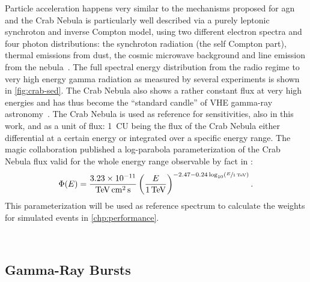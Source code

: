 Particle acceleration happens very similar to the mechanisms proposed for \gls{agn}
and the Crab Nebula is particularly well described via a purely leptonic 
synchroton and inverse Compton model,
using two different electron spectra and four photon distributions: 
the synchroton radiation (the self Compton part), thermal emissions from dust, the
cosmic microwave background and line emission from the nebula~\cite{meyer-crab}.
The full spectral energy distribution from the radio regime to very high energy
gamma radiation as measured by several experiments is shown in \autoref{fig:crab-sed}.
The Crab Nebula also shows a rather constant flux at very high energies and
has thus become the \enquote{standard candle} of VHE gamma-ray astronomy~\cite{meyer-crab}.
The Crab Nebula is used as reference for sensitivities, also in this work, and
as a unit of flux: \SI{1}{CU} being the flux of the Crab Nebula either differential
at a certain energy or integrated over a specific energy range.
The \gls{magic} collaboration published a log-parabola parameterization of
the Crab Nebula flux  valid for the whole energy range observable by \gls{fact} in \cite{magic-crab}:
\begin{equation}
  \Phi(E) = \frac{\num{3.23e-11}}{\si{\TeV\cm\squared\second}}
  \left(\frac{E}{\SI{1}{\TeV}}\right)^{\num{-2.47} - \num{0.24} \log_{10}(\sfrac{E}{\SI{1}{\TeV}})}. \label{eq:magic-crab}
\end{equation}
This parameterization will be used as reference spectrum to calculate the weights
for simulated events in \autoref{chp:performance}.

\begin{landscape}%
  \\
  \label{fig:crab-sed}%
\end{landscape}

\subsection{Gamma-Ray Bursts}

